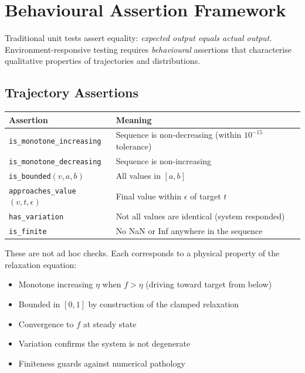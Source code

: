 \documentclass[11pt]{article}
\newcommand{\fn}[1]{\texttt{#1}}
\begin{document}
\section{Behavioural Assertion Framework}
\label{sec:assertions}

Traditional unit tests assert equality: \emph{expected output equals actual
output}.  Environment-responsive testing requires \emph{behavioural}
assertions that characterise qualitative properties of trajectories and
distributions.

\subsection{Trajectory Assertions}

\begin{center}
\begin{tabular}{lp{7cm}}
    \textbf{Assertion} & \textbf{Meaning} \\
    \midrule
    \fn{is\_monotone\_increasing}
        & Sequence is non-decreasing (within $10^{-15}$ tolerance) \\
    \fn{is\_monotone\_decreasing}
        & Sequence is non-increasing \\
    \fn{is\_bounded}$(v, a, b)$
        & All values in $[a, b]$ \\
    \fn{approaches\_value}$(v, t, \epsilon)$
        & Final value within $\epsilon$ of target $t$ \\
    \fn{has\_variation}
        & Not all values are identical (system responded) \\
    \fn{is\_finite}
        & No NaN or Inf anywhere in the sequence \\
\end{tabular}
\end{center}

These are not ad hoc checks.  Each corresponds to a physical property of
the relaxation equation:
\begin{itemize}
    \item Monotone increasing $\eta$ when $f > \eta$ (driving toward
          target from below)
    \item Bounded in $[0, 1]$ by construction of the clamped relaxation
    \item Convergence to $f$ at steady state
    \item Variation confirms the system is not degenerate
    \item Finiteness guards against numerical pathology
\end{itemize}
\end{document}
